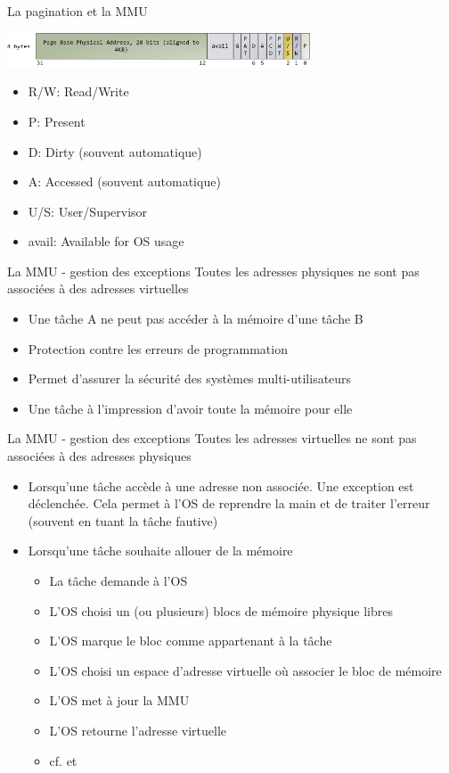 \begin{frame}{La pagination et la MMU}
    \begin{center}
      \includegraphics[width=9cm]{pics/x86PageTableEntry4KB}
    \end{center}    
  \begin{itemize}
  \item R/W: Read/Write
  \item P: Present
  \item D: Dirty (souvent automatique)
  \item A: Accessed (souvent automatique)
  \item U/S: User/Supervisor
  \item avail: Available for OS usage
    \end{itemize}
\end{frame}

\begin{frame}{La MMU - gestion des exceptions}
  Toutes les adresses physiques ne sont pas associées à des adresses
  virtuelles
  \begin{itemize}
  \item Une tâche A ne peut pas accéder à la mémoire d'une tâche B
  \item Protection contre les erreurs de programmation
  \item Permet d'assurer la sécurité des systèmes multi-utilisateurs
  \item Une tâche à l'impression d'avoir toute la mémoire pour elle
  \end{itemize}
\end{frame}

\begin{frame}{La MMU - gestion des exceptions}
  Toutes  les  adresses  virtuelles  ne  sont  pas  associées  à  des
  adresses physiques
  \begin{itemize}
  \item  Lorsqu'une tâche  accède à  une adresse  non  associée.  Une
    exception est déclenchée.  Cela permet à l'OS de reprendre la main
    et de traiter l'erreur (souvent en tuant la tâche fautive)
  \item Lorsqu'une tâche souhaite allouer de la mémoire
    \begin{itemize}
    \item  La tâche demande à l'OS
    \item  L'OS choisi  un (ou  plusieurs) blocs  de  mémoire physique
      libres
    \item L'OS marque le bloc comme appartenant à la tâche
    \item  L'OS choisi un  espace d'adresse  virtuelle où  associer le
      bloc de mémoire
    \item L'OS met à jour la MMU
    \item L'OS retourne l'adresse virtuelle
    \item cf.  et 
    \end{itemize}
  \end{itemize}
\end{frame}

